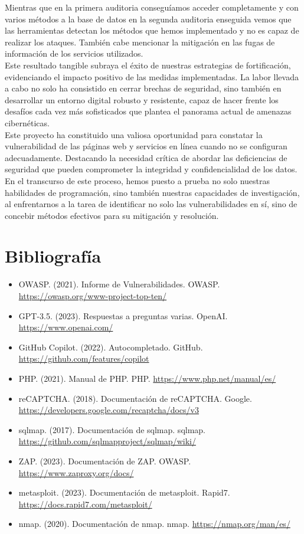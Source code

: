 \documentclass{report}
\begin{document}
    Mientras que en la primera auditoria conseguíamos acceder completamente y con varios métodos a la base de datos en la segunda auditoria enseguida vemos que las herramientas detectan los métodos que hemos implementado y no es capaz de realizar los ataques. También cabe mencionar la mitigación en las fugas de información de los servicios utilizados.\\
    
    Este resultado tangible subraya el éxito de nuestras estrategias de fortificación, evidenciando el impacto positivo de las medidas implementadas. La labor llevada a cabo no solo ha consistido en cerrar brechas de seguridad, sino también en desarrollar un entorno digital robusto y resistente, capaz de hacer frente los desafíos cada vez más sofisticados que plantea el panorama actual de amenazas cibernéticas.\\
    
    Este proyecto ha constituido una valiosa oportunidad para constatar la vulnerabilidad de las páginas web y servicios en línea cuando no se configuran adecuadamente. Destacando la necesidad crítica de abordar las deficiencias de seguridad que pueden comprometer la integridad y confidencialidad de los datos.\\
    
    En el transcurso de este proceso, hemos puesto a prueba no solo nuestras habilidades de programación, sino también nuestras capacidades de investigación, al enfrentarnos a la tarea de identificar no solo las vulnerabilidades en sí, sino de concebir métodos efectivos para su mitigación y resolución.\\
    \chapter{Bibliografía}
        \begin{itemize}
            \item OWASP. (2021). Informe de Vulnerabilidades. OWASP. \url{https://owasp.org/www-project-top-ten/}
            \item GPT-3.5. (2023). Respuestas a preguntas varias. OpenAI. \url{https://www.openai.com/}
            \item GitHub Copilot. (2022). Autocompletado. GitHub. \url{https://github.com/features/copilot}
            \item PHP. (2021). Manual de PHP. PHP. \url{https://www.php.net/manual/es/}
            \item reCAPTCHA. (2018). Documentación de reCAPTCHA. Google. \url{https://developers.google.com/recaptcha/docs/v3}
            \item sqlmap. (2017). Documentación de sqlmap. sqlmap. \url{https://github.com/sqlmapproject/sqlmap/wiki/}
            \item ZAP. (2023). Documentación de ZAP. OWASP. \url{https://www.zaproxy.org/docs/}
            \item metasploit. (2023). Documentación de metasploit. Rapid7. \url{https://docs.rapid7.com/metasploit/}
            \item nmap. (2020). Documentación de nmap. nmap. \url{https://nmap.org/man/es/}
        \end{itemize}
\end{document}
